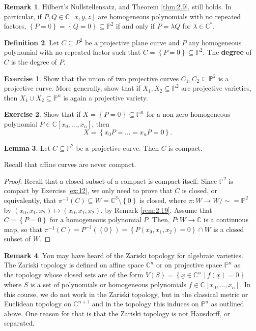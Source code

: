 \documentclass{article}
\newcommand{\C}{\mathbb{C}}
\renewcommand{\P}{\mathbb{P}}
\newcommand{\rb}[1]{\left( #1 \right)}
\renewcommand{\sb}[1]{\left[ #1 \right]}
\newcommand{\cb}[1]{\left\{ #1 \right\}}
\theoremstyle{definition}\newtheorem{definition}{Definition}[section]
\theoremstyle{definition}\newtheorem{notation}[definition]{Notation}
\theoremstyle{definition}\newtheorem{remark}[definition]{Remark}
\theoremstyle{definition}\newtheorem{example}[definition]{Example}
\theoremstyle{definition}\newtheorem{fact}{Fact}
\theoremstyle{definition}\newtheorem{exercise}{Exercise}
\newtheorem{lemma}[definition]{Lemma}
\begin{document}
\begin{remark}
Hilbert's Nullstellensatz, and Theorem \ref{thm:2.9}, still holds. In particular, if $ P, Q \in \C\sb{x, y, z} $ are homogeneous polynomials with no repeated factors, $ \cb{P = 0} = \cb{Q = 0} \subseteq \P^2 $ if and only if $ P = \lambda Q $ for $ \lambda \in \C^* $.
\end{remark}

\begin{definition}
Let $ C \subseteq P^2 $ be a projective plane curve and $ P $ any homogeneous polynomial with no repeated factor such that $ C = \cb{P = 0} \subseteq \P^2 $. The \textbf{degree} of $ C $ is the degree of $ P $.
\end{definition}

\begin{exercise}
Show that the union of two projective curves $ C_1, C_2 \subseteq \P^2 $ is a projective curve. More generally, show that if $ X_1, X_2 \subseteq \P^2 $ are projective varieties, then $ X_1 \cup X_2 \subseteq \P^n $ is again a projective variety.
\end{exercise}

\begin{exercise}
Show that if $ X = \cb{P = 0} \subseteq \P^n $ for a non-zero homogeneous polynomial $ P \in \C\sb{x_0, \dots, x_n} $, then
$$ X = \cb{x_0P = \dots = x_nP = 0}. $$
\end{exercise}

\begin{lemma}
Let $ C \subseteq \P^2 $ be a projective curve. Then $ C $ is compact.
\end{lemma}

Recall that affine curves are never compact.

\begin{proof}
Recall that a closed subset of a compact is compact itself. Since $ \P^2 $ is compact by Exercise \ref{ex:12}, we only need to prove that $ C $ is closed, or equivalently, that $ \pi^{-1}\rb{C} \subseteq W = \C^3 \setminus \cb{\underline{0}} $ is closed, where $ \pi : W \to W / \sim = \P^2 $ by $ \rb{x_0, x_1, x_2} \mapsto \rb{x_0, x_1, x_2} $, by Remark \ref{rem:2.19}. Assume that $ C = \cb{P = 0} $ for a homogeneous polynomial $ P $. Then, $ P : W \to \C $ is a continuous map, so that $ \pi^{-1}\rb{C} = P^{-1}\rb{\cb{0}} = \cb{P\rb{x_0, x_1, x_2} = 0} \cap W $ is a closed subset of $ W $.
\end{proof}

\begin{remark}
You may have heard of the Zariski topology for algebraic varieties. The Zariski topology is defined on affine space $ \C^n $ or on projective space $ \P^n $ as the topology whose closed sets are of the form $ V\rb{S} = \cb{\underline{x} \in \C^n \mid f\rb{\underline{x}} = 0} $ where $ S $ is a set of polynomials or homogeneous polynomials $ f \in \C\sb{x_0, \dots, x_n} $. In this course, we do not work in the Zariski topology, but in the classical metric or Euclidean topology on $ \C^{n + 1} $ and in the topology this induces on $ \P^n $ as outlined above. One reason for that is that the Zariski topology is not Hausdorff, or separated.
\end{remark}
\end{document}
